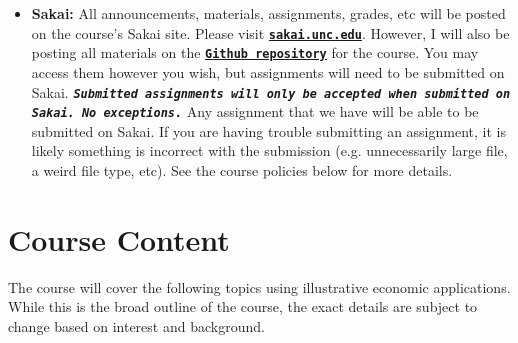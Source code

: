 \documentclass[11pt]{article}
\begin{document}
\begin{itemize}
    \item \textbf{Sakai:} All announcements, materials, assignments, grades, etc will be posted on the course's Sakai site. Please visit \href{https://sakai.unc.edu/welcome/}{\tt\bf sakai.unc.edu}. However, I will also be posting all materials on the \href{https://github.com/alexiom/ECON370}{\tt\bf Github repository} for the course. You may access them however you wish, but assignments will need to be submitted on Sakai. {\tt\bf  \emph{Submitted assignments will only be accepted when submitted on Sakai. No exceptions.}} Any assignment that we have will be able to be submitted on Sakai. If you are having trouble submitting an assignment, it is likely something is incorrect with the submission (e.g. unnecessarily large file, a weird file type, etc). See the course policies below for more details. 
\end{itemize}


\section*{Course Content}
The course will cover the following topics using illustrative economic applications. While this is the broad outline of the course, the exact details are subject to change based on interest and background.
\end{document}
